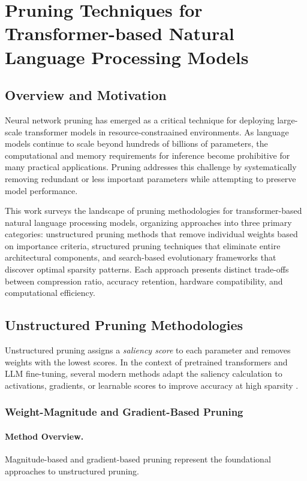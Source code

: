 \section{Pruning Techniques for Transformer-based Natural Language Processing Models}

\subsection{Overview and Motivation}

Neural network pruning has emerged as a critical technique for deploying large-scale transformer models in resource-constraained environments. As language models continue to scale beyond hundreds of billions of parameters, the computational and memory requirements for inference become prohibitive for many practical applications. Pruning addresses this challenge by systematically removing redundant or less important parameters while attempting to preserve model performance.

This work surveys the landscape of pruning methodologies for transformer-based natural language processing models, organizing approaches into three primary categories: unstructured pruning methods that remove individual weights based on importance criteria, structured pruning techniques that eliminate entire architectural components, and search-based evolutionary frameworks that discover optimal sparsity patterns. Each approach presents distinct trade-offs between compression ratio, accuracy retention, hardware compatibility, and computational efficiency.

\subsection{Unstructured Pruning Methodologies}

Unstructured pruning assigns a \emph{saliency score} to each parameter and removes weights with the lowest scores. In the context of pretrained transformers and LLM fine-tuning, several modern methods adapt the saliency calculation to activations, gradients, or learnable scores to improve accuracy at high sparsity \cite{sanh2020movement,sun2023simple,frantar2023sparsegpt}.

\subsubsection{Weight-Magnitude and Gradient-Based Pruning \cite{han2015deep}}

\paragraph{Method Overview.} Magnitude-based and gradient-based pruning represent the foundational approaches to unstructured pruning.


